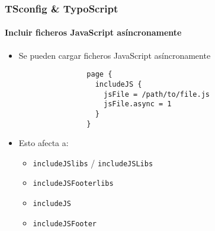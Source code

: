 
\begin{frame}[fragile]
	\frametitle{TSconfig \& TypoScript}
	\framesubtitle{Incluir ficheros JavaScript asíncronamente}

	\begin{itemize}
		\item Se pueden cargar ficheros JavaScript asíncronamente

			\begin{lstlisting}
				page {
				  includeJS {
				    jsFile = /path/to/file.js
				    jsFile.async = 1
				  }
				}
			\end{lstlisting}

		\item Esto afecta a:

			\begin{itemize}
				\item \texttt{includeJSlibs} / \texttt{includeJSLibs}
				\item \texttt{includeJSFooterlibs}
				\item \texttt{includeJS}
				\item \texttt{includeJSFooter}
			\end{itemize}

	\end{itemize}

\end{frame}


